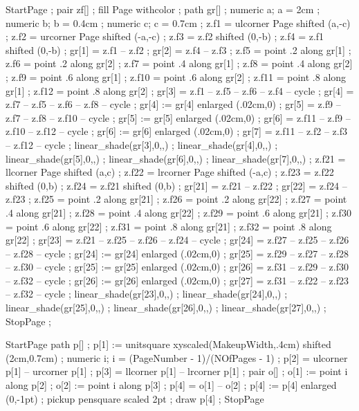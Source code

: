 StartPage ;
pair zf[] ;
fill Page withcolor  ;
path gr[] ;
numeric a; a = 2cm ;
numeric b; b = 0.4cm ;
numeric c; c = 0.7cm ;
z.f1 = ulcorner Page shifted (a,-c) ;
z.f2 = urcorner Page shifted (-a,-c) ;
z.f3 = z.f2 shifted (0,-b) ;
z.f4 = z.f1 shifted (0,-b) ;
gr[1] = z.f1 -- z.f2 ;
gr[2] = z.f4 -- z.f3 ;
z.f5 = point .2 along gr[1] ;
z.f6 = point .2 along gr[2] ;
z.f7 = point .4 along gr[1] ;
z.f8 = point .4 along gr[2] ;
z.f9 = point .6 along gr[1] ;
z.f10 = point .6 along gr[2] ;
z.f11 = point .8 along gr[1] ;
z.f12 = point .8 along gr[2] ;
gr[3] = z.f1 -- z.f5 -- z.f6 -- z.f4 -- cycle ;
gr[4] = z.f7 -- z.f5 -- z.f6 -- z.f8 -- cycle ;
gr[4] := gr[4] enlarged (.02cm,0) ;
gr[5] = z.f9 -- z.f7 -- z.f8 -- z.f10 -- cycle ;
gr[5] := gr[5] enlarged (.02cm,0) ;
gr[6] = z.f11 -- z.f9 -- z.f10 -- z.f12 -- cycle ;
gr[6] := gr[6] enlarged (.02cm,0) ;
gr[7] = z.f11 -- z.f2 -- z.f3 -- z.f12 -- cycle ;
linear_shade(gr[3],0,,) ;
linear_shade(gr[4],0,,) ;
linear_shade(gr[5],0,,) ;
linear_shade(gr[6],0,,) ;
linear_shade(gr[7],0,,) ;
z.f21 = llcorner Page shifted (a,c) ;
z.f22 = lrcorner Page shifted (-a,c) ;
z.f23 = z.f22 shifted (0,b) ;
z.f24 = z.f21 shifted (0,b) ;
gr[21] = z.f21 -- z.f22 ;
gr[22] = z.f24 -- z.f23 ;
z.f25 = point .2 along gr[21] ;
z.f26 = point .2 along gr[22] ;
z.f27 = point .4 along gr[21] ;
z.f28 = point .4 along gr[22] ;
z.f29 = point .6 along gr[21] ;
z.f30 = point .6 along gr[22] ;
z.f31 = point .8 along gr[21] ;
z.f32 = point .8 along gr[22] ;
gr[23] = z.f21 -- z.f25 -- z.f26 -- z.f24 -- cycle ;
gr[24] = z.f27 -- z.f25 -- z.f26 -- z.f28 -- cycle ;
gr[24] := gr[24] enlarged (.02cm,0) ;
gr[25] = z.f29 -- z.f27 -- z.f28 -- z.f30 -- cycle ;
gr[25] := gr[25] enlarged (.02cm,0) ;
gr[26] = z.f31 -- z.f29 -- z.f30 -- z.f32 -- cycle ;
gr[26] := gr[26] enlarged (.02cm,0) ;
gr[27] = z.f31 -- z.f22 -- z.f23 -- z.f32 -- cycle ;
linear_shade(gr[23],0,,) ;
linear_shade(gr[24],0,,) ;
linear_shade(gr[25],0,,) ;
linear_shade(gr[26],0,,) ;
linear_shade(gr[27],0,,) ;
StopPage ;
\stopuniqueMPgraphic

StartPage
path p[] ;
p[1] := unitsquare xyscaled(MakeupWidth,.4cm) shifted (2cm,0.7cm) ;
numeric i; i = (PageNumber - 1)/(NOfPages - 1) ;
p[2] = ulcorner p[1] -- urcorner p[1] ;
p[3] = llcorner p[1] -- lrcorner p[1] ;
pair o[] ;
o[1] := point i along p[2] ;
o[2] := point i along p[3] ;
p[4] = o[1] -- o[2] ;
p[4] := p[4] enlarged (0,-1pt) ;
pickup pensquare scaled 2pt ;
draw p[4] ;
StopPage
\stopuseMPgraphic

